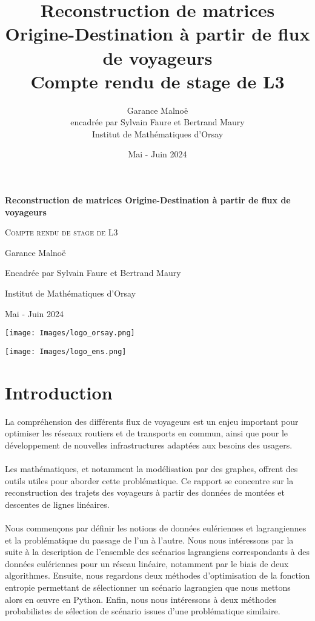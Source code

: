 \documentclass[12pt]{article}
\title{\textbf{Reconstruction de matrices Origine-Destination à partir de flux de voyageurs}\\
Compte rendu de stage de L3}
\author{Garance Malnoë\\
encadrée par Sylvain Faure et Bertrand Maury\\
Institut de Mathématiques d'Orsay}
\date{Mai - Juin 2024}
\begin{document}
\begin{titlepage}
    \centering
    {\huge\bfseries Reconstruction de matrices Origine-Destination à partir de flux de voyageurs\par}
    \vspace{1cm}
    {\scshape\Large Compte rendu de stage de L3\par}
    \vspace{1.5cm}
    {\large Garance Malnoë\par
    Encadrée par Sylvain Faure et Bertrand Maury\par}
    \vspace{0.5cm}
    {\large Institut de Mathématiques d'Orsay\par}
    \vspace{0.5cm}
    {\large Mai - Juin 2024\par}
    \vspace{3cm}
\begin{minipage}{0.45\textwidth}
        \centering
        \texttt{[image: Images/logo\_orsay.png]} %
    \end{minipage}\hfill
    \begin{minipage}{0.45\textwidth}
        \centering
        \texttt{[image: Images/logo\_ens.png]} %
    \end{minipage}\par\vspace{1cm}
\end{titlepage}
\tableofcontents
\newpage
\section{Introduction}
La compréhension des différents flux de voyageurs est un enjeu important pour optimiser les réseaux routiers et de transports en commun, ainsi que pour le développement de nouvelles infrastructures adaptées aux besoins des usagers.\\
\\
Les mathématiques, et notamment la modélisation par des graphes, offrent des outils utiles pour aborder cette problématique. Ce rapport se concentre sur la reconstruction des trajets des voyageurs à partir des données de montées et descentes de lignes linéaires.\\
\\
Nous commençons par définir les notions de données eulériennes et lagrangiennes et la problématique du passage de l'un à l'autre. Nous nous intéressons par la suite à la description de l'ensemble des scénarios lagrangiens correspondants à des données eulériennes pour un réseau linéaire, notamment par le biais de deux algorithmes. Ensuite, nous regardons deux méthodes d'optimisation de la fonction entropie permettant de sélectionner un scénario lagrangien que nous mettons alors en œuvre en Python. Enfin, nous nous intéressons à deux méthodes probabilistes de sélection de scénario issues d'une problématique similaire.\\
\end{document}
